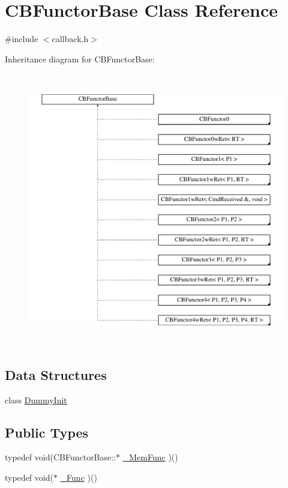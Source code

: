 \hypertarget{class_c_b_functor_base}{\section{C\+B\+Functor\+Base Class Reference}
\label{class_c_b_functor_base}
}


{\ttfamily \#include $<$callback.\+h$>$}

Inheritance diagram for C\+B\+Functor\+Base\+:\begin{figure}[H]
\begin{center}
\leavevmode
\includegraphics[height=12.000000cm]{class_c_b_functor_base}
\end{center}
\end{figure}
\subsection*{Data Structures}
\begin{DoxyCompactItemize}
\item 
class \hyperlink{class_c_b_functor_base_1_1_dummy_init}{Dummy\+Init}
\end{DoxyCompactItemize}
\subsection*{Public Types}
\begin{DoxyCompactItemize}
\item 
typedef void(C\+B\+Functor\+Base\+::$\ast$ \hyperlink{class_c_b_functor_base_a1fae4d86f8096277b2824602d168ef5a}{\+\_\+\+Mem\+Func} )()
\item 
typedef void($\ast$ \hyperlink{class_c_b_functor_base_a36d82f62e1ba03af6b0b24da52d8a96d}{\+\_\+\+Func} )()
\end{DoxyCompactItemize}
